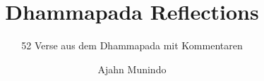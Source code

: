 \documentclass[11pt,twoside,final]{memoir}
\title{Dhammapada Reflections}
\subtitle{52 Verse aus dem Dhammapada mit Kommentaren}
\author{Ajahn Munindo}
\date{}
\begin{document}
%
%
%
%
%
%
%
%
%
%
%
%
%
%
%
%
%
%
%
%
%


\mainmatter*
\end{document}
